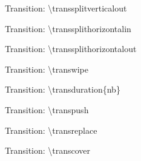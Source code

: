 \documentclass[english,sectioncirclenumberstyle]{ciadbeamer}
\begin{document}
\begin{frame}[c]{Transition: {\textbackslash}transsplitverticalout}
	\transsplitverticalout
	\begin{center}
	\end{center}
\end{frame}

\begin{frame}[c]{Transition: {\textbackslash}transsplithorizontalin}
	\transsplithorizontalin
	\begin{center}
	\end{center}
\end{frame}

\begin{frame}[c]{Transition: {\textbackslash}transsplithorizontalout}
	\transsplithorizontalout
	\begin{center}
	\end{center}
\end{frame}

\begin{frame}[c]{Transition: {\textbackslash}transwipe}
	\transwipe
	\begin{center}
	\end{center}
\end{frame}

\begin{frame}[c]{Transition: {\textbackslash}transduration\{nb\}}
	\begin{center}
	\end{center}
\end{frame}

\begin{frame}[c]{Transition: {\textbackslash}transpush}
	\transpush
	\begin{center}
	\end{center}
\end{frame}

\begin{frame}[c]{Transition: {\textbackslash}transreplace}
	\transreplace
	\begin{center}
	\end{center}
\end{frame}

\begin{frame}[c]{Transition: {\textbackslash}transcover}
	\transcover
	\begin{center}
	\end{center}
\end{frame}
\end{document}
